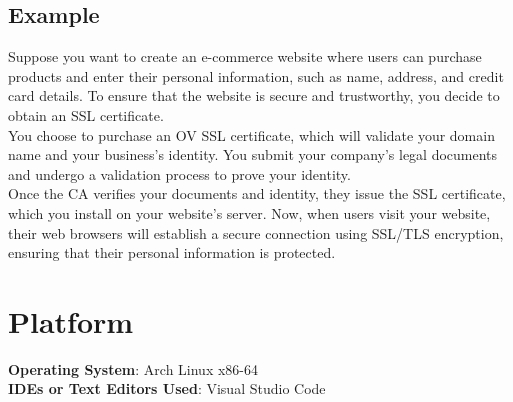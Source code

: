 \documentclass[11pt]{article}
\begin{document}
\subsection{Example}
Suppose you want to create an e-commerce website where users can purchase products and enter their personal information, such as name, address, and credit card details. To ensure that the website is secure and trustworthy, you decide to obtain an SSL certificate.\\

You choose to purchase an OV SSL certificate, which will validate your domain name and your business's identity. You submit your company's legal documents and undergo a validation process to prove your identity.\\

Once the CA verifies your documents and identity, they issue the SSL certificate, which you install on your website's server. Now, when users visit your website, their web browsers will establish a secure connection using SSL/TLS encryption, ensuring that their personal information is protected.

\section{Platform}
\textbf{\textbf{Operating System}}: Arch Linux x86-64 \\
\textbf{\textbf{IDEs or Text Editors Used}}: Visual Studio Code\\
\end{document}

